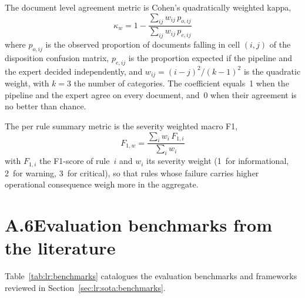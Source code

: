 The document level agreement metric is Cohen's quadratically weighted kappa,
%
\begin{equation}\label{eq:kappa}
  \kappa_w = 1 - \frac{\sum_{ij} w_{ij}\, p_{o,ij}}{\sum_{ij} w_{ij}\, p_{e,ij}}
\end{equation}
%
where $p_{o,ij}$ is the observed proportion of documents falling in cell $(i,j)$ of the disposition confusion matrix, $p_{e,ij}$ is the proportion expected if the pipeline and the expert decided independently, and $w_{ij} = (i-j)^2/(k-1)^2$ is the quadratic weight, with $k=3$ the number of categories. The coefficient equals~1 when the pipeline and the expert agree on every document, and~0 when their agreement is no better than chance.

The per rule summary metric is the severity weighted macro F1,
%
\begin{equation}\label{eq:f1w}
  F_{1,w} = \frac{\sum_i w_i\, F_{1,i}}{\sum_i w_i}
\end{equation}
%
with $F_{1,i}$ the F1-score of rule~$i$ and $w_i$ its severity weight (1~for informational, 2~for warning, 3~for critical), so that rules whose failure carries higher operational consequence weigh more in the aggregate.


\section*{A.6\quad Evaluation benchmarks from the literature}

Table~\ref{tab:lr:benchmarks} catalogues the evaluation benchmarks and frameworks reviewed in Section~\ref{sec:lr:sota:benchmarks}.

